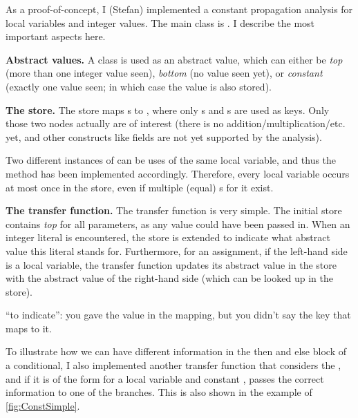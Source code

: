     As a proof-of-concept, I (Stefan) implemented a constant propagation analysis for local variables
    and integer values.  The main class is 
    . 
    I describe the most important aspects here.
    
    \textbf{Abstract values.} A class  is used as an abstract value, which can
    either be \emph{top} (more than one integer value seen), \emph{bottom} (no value seen yet),
    or \emph{constant} (exactly one value seen; in which case the value is also stored).
    
    \textbf{The store.} The store maps s to ,
    where only s and s are
    used as keys.  Only those
    two nodes actually are of interest (there is no addition/multiplication/etc. yet, and other constructs like
    fields are not yet supported by the analysis).
    
    Two different instances of  can be uses of the same local variable, and thus
    the  method has been implemented accordingly. Therefore, every local variable occurs
    at most once in the store, even if multiple (equal) s for it exist.
    
    \textbf{The transfer function.} The transfer function is very simple. The initial store contains
    \emph{top} for all parameters, as any value could have been passed in.  When 
    an integer literal is encountered, the store is extended to indicate what abstract value this literal
    stands for. Furthermore, for an assignment, if the left-hand side is
    a local variable, the transfer function updates its abstract value in the
    store with the abstract value of the right-hand side (which can be looked up in the store).
    
\begin{workinprogress}
``to indicate'':  you gave the value in the mapping, but you didn't say the
key that maps to it.
\end{workinprogress}

    To illustrate how we can have different information in the then and else block of a conditional,
    I also implemented another transfer function that considers the , and if
    it is of the form  for a local variable  and constant , passes
    the correct information to one of the branches. This is also shown in the example of \autoref{fig:ConstSimple}.
    
